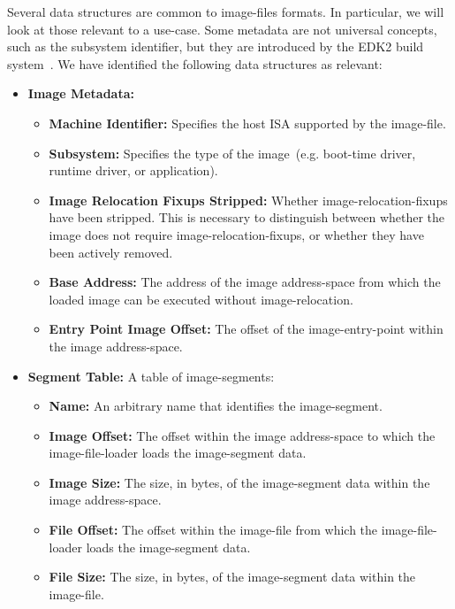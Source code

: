 Several data structures are common to \glspl{image-file} formats. In particular, we will look at those relevant to a  use-case. Some metadata are not universal concepts, such as the subsystem identifier, but they are introduced by the \gls{EDK2} build system~\cite{elf-spec,macho-spec,pe-format,edk2}. We have identified the following data structures as relevant:
\begin{itemize}
  \item \textbf{Image Metadata:}\mynobreakpar
  \begin{itemize}
    \item \textbf{Machine Identifier:} Specifies the host \gls{ISA} supported by the \gls{image-file}.
    \item \textbf{Subsystem:} Specifies the type of the \gls{image}~(e.g. boot-time driver, runtime driver, or application).
    \item \textbf{Image Relocation Fixups Stripped:} Whether \glspl{image-relocation-fixup} have been stripped. This is necessary to distinguish between whether the \gls{image} does not require \glspl{image-relocation-fixup}, or whether they have been actively removed.
    \item \textbf{Base Address:} The address of the \gls{image} \gls{address-space} from which the loaded \gls{image} can be executed without \gls{image-relocation}.
    \item \textbf{Entry Point Image Offset:} The offset of the \gls{image-entry-point} within the \gls{image} \gls{address-space}.
  \end{itemize}
  \item \textbf{Segment Table:} A table of \glspl{image-segment}:\mynobreakpar
  \begin{itemize}
    \item \textbf{Name:} An arbitrary name that identifies the \gls{image-segment}.
    \item \textbf{Image Offset:} The offset within the \gls{image} \gls{address-space} to which the \gls{image-file-loader} loads the \gls{image-segment} data.
    \item \textbf{Image Size:} The size, in \glspl{byte}, of the \gls{image-segment} data within the \gls{image} \gls{address-space}.
    \item \textbf{File Offset:} The offset within the \gls{image-file} from which the \gls{image-file-loader} loads the \gls{image-segment} data.
    \item \textbf{File Size:} The size, in \glspl{byte}, of the \gls{image-segment} data within the \gls{image-file}.

\end{itemize}
\end{itemize}
